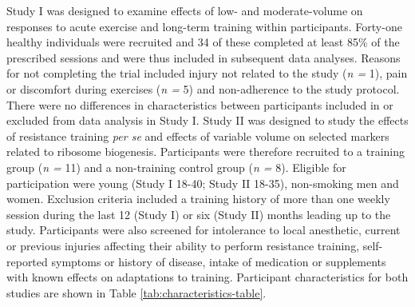 \documentclass[twoside,10pt]{gihclass} %
\begin{document}
Study I was designed to examine effects of low- and moderate-volume on responses to acute exercise and long-term training within participants. Forty-one healthy individuals were recruited and 34 of these completed at least 85\% of the prescribed sessions and were thus included in subsequent data analyses. Reasons for not completing the trial included injury not related to the study (\emph{n =} 1), pain or discomfort during exercises (\emph{n = }5) and non-adherence to the study protocol. There were no differences in characteristics between participants included in or excluded from data analysis in Study I. Study II was designed to study the effects of resistance training \emph{per se} and effects of variable volume on selected markers related to ribosome biogenesis. Participants were therefore recruited to a training group (\emph{n =} 11) and a non-training control group (\emph{n =} 8). Eligible for participation were young (Study I 18-40; Study II 18-35), non-smoking men and women. Exclusion criteria included a training history of more than one weekly session during the last 12 (Study I) or six (Study II) months leading up to the study. Participants were also screened for intolerance to local anesthetic, current or previous injuries affecting their ability to perform resistance training, self-reported symptoms or history of disease, intake of medication or supplements with known effects on adaptations to training. Participant characteristics for both studies are shown in Table \ref{tab:characteristics-table}.
\end{document}
